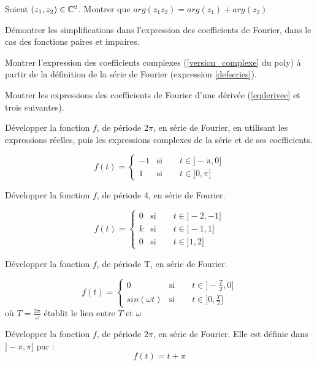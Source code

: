 

\exercice
Soient $(z_1,z_2)\in \mathbb{C}^2$. Montrer que $arg(z_1z_2)=arg(z_1)+arg(z_2)$

\exercice 
Démontrer les simplifications dans l'expression des coefficients de Fourier, dans le cas des fonctions paires et impaires.

\exercice 
Montrer l'expression des coefficients complexes (\ref{version_complexe} du poly) à partir de la définition de la série de Fourier (expression \ref{defseries}). 

\exercice
Montrer les expressions des coefficients de Fourier d'une dérivée (\ref{eqderivee} et trois suivantes).

\exercice
Développer la fonction $f$, de période $2\pi$, en série de Fourier, en utilisant les expressions réelles, puis les expressions complexes de la série et de ses coefficients.

\begin{equation*}
f(t)=
\begin{cases}
-1 & \text{si}\qquad t\in ]-\pi,0] \\
1 & \text{si}\qquad t\in ]0,\pi]
\end{cases}
\end{equation*} 

\exercice
Développer la fonction $f$, de période 4, en série de Fourier.

\begin{equation*}
f(t)=
\begin{cases}
 0 & \text{si}\qquad t\in ]-2,-1] \\
 k & \text{si}\qquad t\in ]-1,1] \\
 0 & \text{si}\qquad t\in ]1,2] 
\end{cases}
\end{equation*} 


\exercice
Développer la fonction $f$, de période T, en série de Fourier.

\begin{equation*}
f(t)=
\begin{cases}
 0 & \text{si}\qquad t\in ]-\frac{T}{2},0] \\
 sin(\omega t) & \text{si}\qquad t\in ]0,\frac{T}{2}]
\end{cases}
\end{equation*} 
où $T=\frac{2\pi}{\omega}$ établit le lien entre $T$ et $\omega$

\exercice
Développer la fonction $f$, de période $2\pi$, en série de Fourier. Elle est définie dans $]-\pi,\pi]$ par :
\begin{equation*}
f(t)= t+\pi
\end{equation*} 

